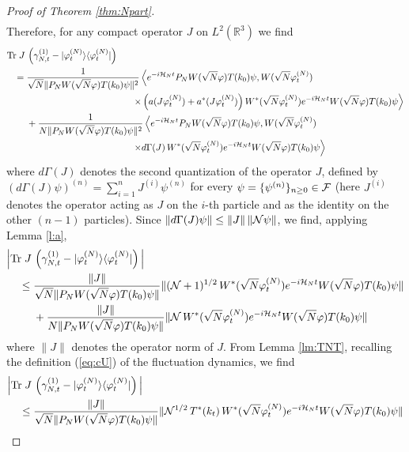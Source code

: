 \documentclass[11pt,a4paper]{article}
\newcommand{\bR}{{\mathbb R}}
\newcommand{\tr}{\mbox{Tr}}
\newcommand{\cF}{{\cal F}}
\newcommand{\cH}{{\cal H}}
\newcommand{\cN}{{\cal N}}
\newcommand{\ph}{\varphi_t^{(N)}}	%
\begin{document}
\begin{proof}[Proof of Theorem \ref{thm:Npart}]
\[\begin{split}
\end{split} \]
Therefore, for any compact operator $J$ on $L^2 (\bR^3)$ we find 
\[ \begin{split} 
\tr \; J \, &\left( \gamma^{(1)}_{N,t} - |\ph \rangle\langle \ph| \right) \\ = \; &\frac{1}{\sqrt{N} \| P_N W(\sqrt{N} \varphi) T(k_0) \psi \|^2}  \left\langle  
e^{-i\cH_N t}  P_N W(\sqrt{N} \varphi) T(k_0) \psi , W (\sqrt{N} \varphi_t^{(N)}) \right. \\ & \left. \hspace{4cm} \times \left( a (J\ph) + a^* (J \ph) \right) W^*(\sqrt{N} \varphi_t^{(N)})  e^{-i\cH_N t}  W(\sqrt{N} \varphi) T(k_0) \psi \right\rangle
\\ &+  \frac{1}{N \| P_N W(\sqrt{N} \varphi) T(k_0) \psi \|^2} \left\langle  
e^{-i\cH_N t}  P_N W(\sqrt{N} \varphi) T(k_0) \psi , W (\sqrt{N} \varphi_t^{(N)}) \right. \\ &\hspace{4cm} \left.  \times d\Gamma (J) \, W^*(\sqrt{N} \varphi_t^{(N)})  e^{-i\cH_N t}  W(\sqrt{N} \varphi) T(k_0) \psi \right\rangle \end{split} \]
where $d\Gamma (J)$ denotes the second quantization of the operator $J$, defined by  
\( (d\Gamma (J) \psi)^{(n)} = \sum_{i=1}^n J^{(i)} \psi^{(n)} \)
for every $\psi = \{ \psi^{(n)} \}_{n\geq 0} \in \cF$ (here $J^{(i)}$ denotes the operator acting as $J$ on the $i$-th particle and as the identity on the other $(n-1)$ particles). Since $\| d\Gamma (J)  \psi \| \leq \| J \| \, \| \cN \psi \|$, we find, applying Lemma \ref{l:a}, 
\[ \begin{split}
\Big| \tr \; J \, &\left( \gamma^{(1)}_{N,t} - |\ph \rangle\langle \ph| \right)  \Big| \\ \leq \; &\frac{\| J \|}{\sqrt{N} \| P_N W(\sqrt{N} \varphi) T(k_0) \psi \|}   \| (\cN+1)^{1/2} \, W^*(\sqrt{N} \varphi_t^{(N)})  e^{-i\cH_N t}  W(\sqrt{N} \varphi) T(k_0) \psi \| 
\\ &+  \frac{\| J \|}{N \| P_N W(\sqrt{N} \varphi) T(k_0) \psi \|} \| \cN \, W^*(\sqrt{N} \varphi_t^{(N)})  e^{-i\cH_N t}  W(\sqrt{N} \varphi) T(k_0) \psi \|  \end{split} \]
where $\| J \|$ denotes the operator norm of $J$. {F}rom Lemma \ref{lm:TNT}, recalling the definition 
(\ref{eq:cU}) of the fluctuation dynamics, we find
\[  \begin{split}
\Big| \tr \; J \, &\left( \gamma^{(1)}_{N,t} - |\ph \rangle\langle \ph| \right)  \Big| \\  \leq \; &\frac{\| J \|}{\sqrt{N} \| P_N W(\sqrt{N} \varphi) T(k_0) \psi \|}  \| \cN^{1/2} \,T^* (k_t) \,  W^* (\sqrt{N} \varphi_t^{(N)})  e^{-i\cH_N t}  W(\sqrt{N} \varphi) T(k_0) \psi \|  

\end{split}\]
\end{proof}
\end{document}
